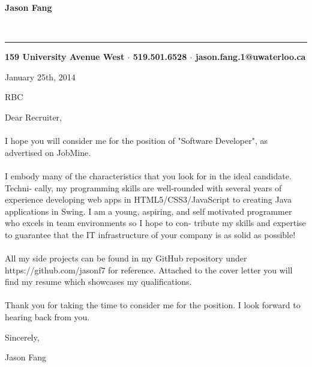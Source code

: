 \documentclass[12pt]{article}
\begin{document}
\pagestyle{empty}
\setlength{\parindent}{10cm}

\begin{center}
\begin{huge}\textbf{Jason Fang}\end{huge}\\
\rule{475pt}{1pt}
\textbf{159 University Avenue West $\cdot$ 519.501.6528 $\cdot$ jason.fang.1@uwaterloo.ca} 
\end{center}


\setlength{\parindent}{0pt}

\vspace{24pt}January 25th, 2014 

RBC

Dear Recruiter,

\paragraph*{}\hspace{10pt}I hope you will consider me for the position of "Software Developer", as advertised on JobMine.

\paragraph*{}\hspace{10pt}I embody many of the characteristics that you look for in the ideal candidate. Techni-
cally, my programming skills are well-rounded with several years of experience developing
web apps in HTML5/CSS3/JavaScript to creating Java applications in Swing. I am a young,
aspiring, and self motivated programmer who excels in team environments so I hope to con-
tribute my skills and expertise to guarantee that the IT infrastructure of your company is
as solid as possible!

\paragraph*{}\hspace{10pt}All my side projects can be found in my GitHub repository under https://github.com/jasonf7 for reference. Attached to the cover letter you will find my resume which showcases my qualifications.

\paragraph*{}\hspace{10pt}Thank you for taking the time to consider me for the position. I look forward to hearing back from you.

\vspace{12pt}Sincerely,

\vspace{12pt}Jason Fang
\end{document}
